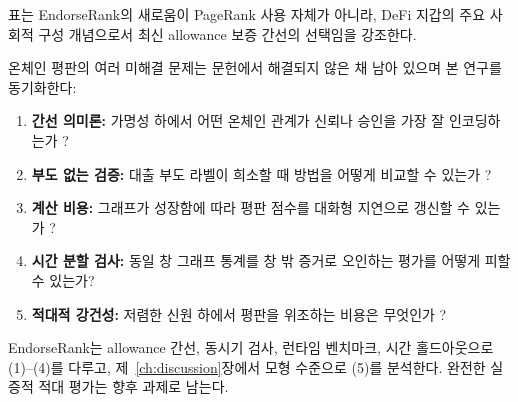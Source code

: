 표는 EndorseRank의 새로움이 PageRank 사용 자체가 아니라, DeFi 지갑의 주요 사회적 구성 개념으로서 최신 allowance 보증 간선의 선택임을 강조한다.


온체인 평판의 여러 미해결 문제는 문헌에서 해결되지 않은 채 남아 있으며 본 연구를 동기화한다:

\begin{enumerate}
\item \textbf{간선 의미론:} 가명성 하에서 어떤 온체인 관계가 신뢰나 승인을 가장 잘 인코딩하는가 ?
\item \textbf{부도 없는 검증:} 대출 부도 라벨이 희소할 때 방법을 어떻게 비교할 수 있는가 ?
\item \textbf{계산 비용:} 그래프가 성장함에 따라 평판 점수를 대화형 지연으로 갱신할 수 있는가 ?
\item \textbf{시간 분할 검사:} 동일 창 그래프 통계를 창 밖 증거로 오인하는 평가를 어떻게 피할 수 있는가?
\item \textbf{적대적 강건성:} 저렴한 신원 하에서 평판을 위조하는 비용은 무엇인가 ?
\end{enumerate}

EndorseRank는 allowance 간선, 동시기 검사, 런타임 벤치마크, 시간 홀드아웃으로 (1)--(4)를 다루고, 제~\ref{ch:discussion}장에서 모형 수준으로 (5)를 분석한다. 완전한 실증적 적대 평가는 향후 과제로 남는다.
